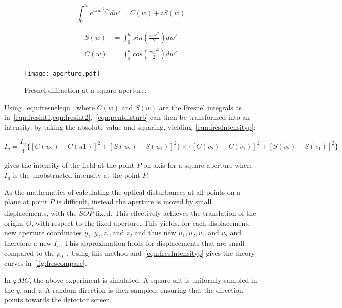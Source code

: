 \begin{equation}
\int_{0}^{w}e^{i\pi w'^2/2}dw'=C(w)+iS(w)
\label{eqn:fresneleqn}
\end{equation}


\begin{align}
S(w)&=\int^w_0 sin\left(\frac{\pi w'^2}{2}\right)dw'\label{eqn:fresint1}\\
C(w)&=\int^w_0 cos\left(\frac{\pi w'^2}{2}\right)dw'\label{eqn:fresint2}
\end{align}


\begin{figure}[!ht]
    \centering
    \texttt{[image: aperture.pdf]}
    \caption{Fresnel diffraction at a square aperture.}
    \label{fig:aperture}
\end{figure}


Using~\cref{eqn:fresneleqn}, where $C(w)$ and $S(w)$ are the Fresnel integrals as in~\cref{eqn:fresint1,eqn:fresint2},~\cref{eqn:pentdisturb} can then be transformed into an intensity, by taking the absolute value and squaring, yielding~\cref{eqn:fresIntensityp}:


\begin{equation}
I_p = \frac{I_u}{4} \{[C(u_2) - C(u1)]^2 + [S(u_2) - S(u_1)]^2\} \times \{[C(v_2) - C(v_1)]^2 + [S(v_2) - S(v_1)]^2\}
\label{eqn:fresIntensityp}
\end{equation}

 gives the intensity of the field at the point $P$ on axis for a square aperture where $I_u$ is the unobstructed intensity at the point $P$. 

As the mathematics of calculating the optical disturbances at all points on a plane at point $P$ is difficult, instead the aperture is moved by small displacements, with the $\overrightarrow{SOP}$ fixed.
This effectively achieves the translation of the origin, $O$, with respect to the fixed aperture. 
This yields, for each displacement, new aperture coordinates $y_1, y_2, z_1, \text{and } z_2$ and thus new $u_1, u_2, v_1, \text{and }v_2$ and therefore a new $I_u$.
This approximation holds for displacements that are small compared to the $\rho_0$~\cite{born2000principles,hecht2017optics,goodman2017introduction}.
Using this method and~\cref{eqn:fresIntensityp} gives the theory curves in~\cref{fig:frescompare}.

\medskip

In $\varphi MC$, the above experiment is simulated. 
A square slit is uniformly sampled in the $y$, and $z$. 
A random direction is then sampled, ensuring that the direction points towards the detector screen.

